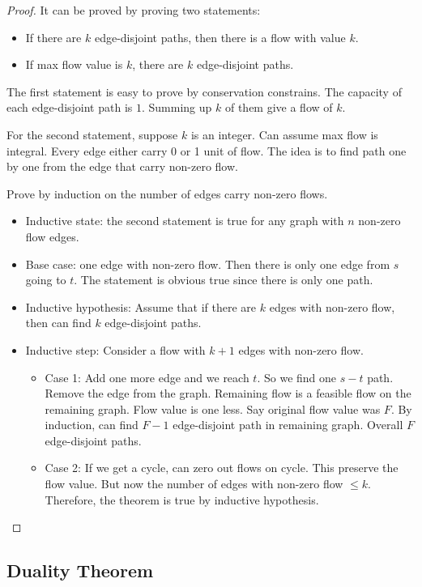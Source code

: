 \begin{proof}
	It can be proved by proving two statements:
	\begin{itemize}
		\item If there are $k$ edge-disjoint paths, then there is a flow with value $k$.
		\item If max flow value is $k$, there are $k$ edge-disjoint paths.
	\end{itemize}

The first statement is easy to prove by conservation constrains. The capacity of each edge-disjoint path is $1$. Summing up $k$ of them give a flow of $k$.

For the second statement, suppose $k$ is an integer. Can assume max flow is integral. Every edge either carry 0 or 1 unit of flow. The idea is to find path one by one from the edge that carry non-zero flow.

Prove by induction on the number of edges carry non-zero flows.

\begin{itemize}
	\item Inductive state: the second statement is true for any graph with $n$ non-zero flow edges.
	\item Base case: one edge with non-zero flow. Then there is only one edge from $s$ going to $t$. The statement is obvious true since there is only one path.
	\item Inductive hypothesis: Assume that if there are $k$ edges with non-zero flow, then can find $k$ edge-disjoint paths.
	\item Inductive step: Consider a flow with $k+1$ edges with non-zero flow. 
	\begin{itemize}
		\item Case 1: Add one more edge and we reach $t$. So we find one $s-t$ path. Remove the edge from the graph. Remaining flow is a feasible flow on the remaining graph. Flow value is one less. Say original flow value was $F$. By induction, can find $F-1$ edge-disjoint path in remaining graph. Overall $F$ edge-disjoint paths.
		\item Case 2: If we get a cycle, can zero out flows on cycle. This preserve the flow value. But now the number of edges with non-zero flow $\le k$. Therefore, the theorem is true by inductive hypothesis.
	\end{itemize}
\end{itemize}
\end{proof}
\subsection{Duality Theorem}

